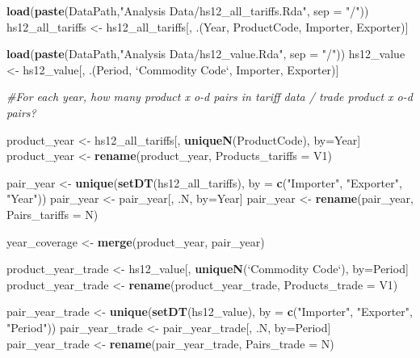 \documentclass[10pt,]{article}
\newenvironment{Shaded}{\begin{snugshade}}{\end{snugshade}}
\newcommand{\KeywordTok}[1]{\textcolor[rgb]{0.13,0.29,0.53}{\textbf{{#1}}}}
\newcommand{\DataTypeTok}[1]{\textcolor[rgb]{0.13,0.29,0.53}{{#1}}}
\newcommand{\StringTok}[1]{\textcolor[rgb]{0.31,0.60,0.02}{{#1}}}
\newcommand{\CommentTok}[1]{\textcolor[rgb]{0.56,0.35,0.01}{\textit{{#1}}}}
\newcommand{\NormalTok}[1]{{#1}}
\begin{document}
\begin{Shaded}
\begin{Highlighting}[]
\KeywordTok{load}\NormalTok{(}\KeywordTok{paste}\NormalTok{(DataPath,}\StringTok{"Analysis Data/hs12_all_tariffs.Rda"}\NormalTok{, }\DataTypeTok{sep =} \StringTok{"/"}\NormalTok{))}
\NormalTok{hs12_all_tariffs <-}\StringTok{ }\NormalTok{hs12_all_tariffs[, .(Year, ProductCode, Importer, Exporter)]}

\KeywordTok{load}\NormalTok{(}\KeywordTok{paste}\NormalTok{(DataPath,}\StringTok{"Analysis Data/hs12_value.Rda"}\NormalTok{, }\DataTypeTok{sep =} \StringTok{"/"}\NormalTok{))}
\NormalTok{hs12_value <-}\StringTok{ }\NormalTok{hs12_value[, .(Period, }\StringTok{`}\DataTypeTok{Commodity Code}\StringTok{`}\NormalTok{, Importer, Exporter)]}

\CommentTok{#For each year, how many product x o-d pairs in tariff data / trade product x o-d pairs?}

\NormalTok{product_year <-}\StringTok{ }\NormalTok{hs12_all_tariffs[, }\KeywordTok{uniqueN}\NormalTok{(ProductCode), by=Year]}
\NormalTok{product_year <-}\StringTok{ }\KeywordTok{rename}\NormalTok{(product_year, }\DataTypeTok{Products_tariffs =} \NormalTok{V1)}

\NormalTok{pair_year <-}\StringTok{ }\KeywordTok{unique}\NormalTok{(}\KeywordTok{setDT}\NormalTok{(hs12_all_tariffs), }\DataTypeTok{by =} \KeywordTok{c}\NormalTok{(}\StringTok{"Importer"}\NormalTok{, }\StringTok{"Exporter"}\NormalTok{, }\StringTok{"Year"}\NormalTok{))}
\NormalTok{pair_year <-}\StringTok{ }\NormalTok{pair_year[, .N, by=Year]}
\NormalTok{pair_year <-}\StringTok{ }\KeywordTok{rename}\NormalTok{(pair_year, }\DataTypeTok{Pairs_tariffs =} \NormalTok{N)}

\NormalTok{year_coverage <-}\StringTok{ }\KeywordTok{merge}\NormalTok{(product_year, pair_year)}

\NormalTok{product_year_trade <-}\StringTok{ }\NormalTok{hs12_value[, }\KeywordTok{uniqueN}\NormalTok{(}\StringTok{`}\DataTypeTok{Commodity Code}\StringTok{`}\NormalTok{), by=Period]}
\NormalTok{product_year_trade <-}\StringTok{ }\KeywordTok{rename}\NormalTok{(product_year_trade, }\DataTypeTok{Products_trade =} \NormalTok{V1)}

\NormalTok{pair_year_trade <-}\StringTok{ }\KeywordTok{unique}\NormalTok{(}\KeywordTok{setDT}\NormalTok{(hs12_value), }\DataTypeTok{by =} \KeywordTok{c}\NormalTok{(}\StringTok{"Importer"}\NormalTok{, }\StringTok{"Exporter"}\NormalTok{, }\StringTok{"Period"}\NormalTok{))}
\NormalTok{pair_year_trade <-}\StringTok{ }\NormalTok{pair_year_trade[, .N, by=Period]}
\NormalTok{pair_year_trade <-}\StringTok{ }\KeywordTok{rename}\NormalTok{(pair_year_trade, }\DataTypeTok{Pairs_trade =} \NormalTok{N)}


\end{Highlighting}
\end{Shaded}
\end{document}
